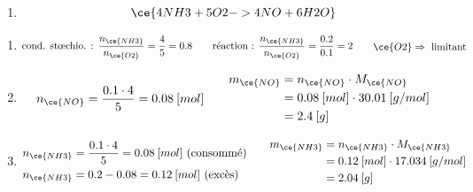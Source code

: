 \documentclass[
  11pt,
  french,
  a4paper,
  openany]{book}
\providecommand{\tightlist}{%
  \setlength{\itemsep}{0pt}\setlength{\parskip}{0pt}}
\begin{document}
\begin{Answer}

\begin{enumerate}
\def\labelenumi{\arabic{enumi}.}
\tightlist
\item
  \[ \ce{4 NH3 + 5 O2 -> 4 NO + 6 H2O} \]
\end{enumerate}

\begin{enumerate}
\def\labelenumi{\alph{enumi}.}
\item
  \[ \begin{split}
           \text{cond. stœchio. : }\frac{n_{\ce{NH3}}}{n_{\ce{O2}}} = \frac{4}{5} = 0.8
       \end{split}
       \qquad
       \begin{split}
           \text{réaction : }\frac{n_{\ce{NH3}}}{n_{\ce{O2}}} = \frac{0.2}{0.1} = 2
       \end{split}
       \qquad
       \begin{split}
           \ce{O2} \Rightarrow\text{ limitant}
       \end{split} \]
\item
  \[ \begin{split}
           n_{\ce{NO}} = \frac{0.1 \cdot 4}{5} = 0.08\:[mol]
       \end{split}
       \qquad
       \begin{split}
           m_{\ce{NO}} &= n_{\ce{NO}} \cdot M_{\ce{NO}} \\
           &= 0.08\:[mol] \cdot 30.01\:[g/mol] \\
           &= 2.4\:[g]
       \end{split} \]
\item
  \[ \begin{split}
           n_{\ce{NH3}} &= \frac{0.1 \cdot 4}{5} = 0.08\:[mol] \text{ (consommé)} \\
           n_{\ce{NH3}} &= 0.2 - 0.08 = 0.12\:[mol] \text{ (excès)}
       \end{split}
       \qquad
       \begin{split}
           m_{\ce{NH3}} &= n_{\ce{NH3}} \cdot M_{\ce{NH3}} \\
           &= 0.12\:[mol] \cdot 17.034\:[g/mol] \\
           &= 2.04\:[g]
       \end{split} \]
\end{enumerate}


\end{Answer}
\end{document}
